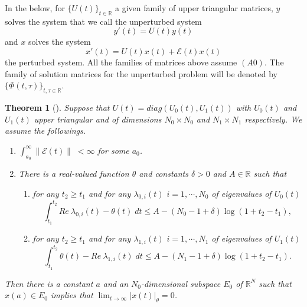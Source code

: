 \documentclass[a4paper,11pt]{article}
\newcommand{\upl}{\overline{\lambda}}
\newcommand{\udl}{\underline{\lambda}}
\newcommand{\E}{\mathcal{E}}
\newcounter{Theorem}
\newtheorem{theorem}[Theorem]{Theorem}
\theoremstyle{remark}
\begin{document}
In the below, for $\{U(t)\}_{t \in \mathbb{R}}$ a given family of upper triangular matrices, $y$ solves the system that we call the unperturbed system
\begin{equation}\label{eq:1}
 y'(t)=U(t)y(t)
\end{equation}
and $x$ solves the system
\begin{equation}\label{eq:2}
 x'(t) = U(t)x(t) + \E(t)x(t)
\end{equation}
the perturbed system. All the families of matrices above assume $(A0)$. The family of solution matrices for the unperturbed problem will be denoted by $\{\Phi(t,\tau)\}_{t,\tau \in \mathbb{R}}$.

% 
% 
% 
% 
% 
% 


\begin{theorem}[\cite{L19}] Suppose that $U(t)=diag(U_0(t),U_1(t))$ with $U_0(t)$ and $U_1(t)$ upper triangular and of dimensions $N_0\times N_0$ and $N_1 \times N_1$ respectively. We assume the followings.%
\begin{enumerate}
 \item $\int_{a_0}^\infty \|\E(t)\| \; < \infty$ for some $a_0$.
 \item There is a real-valued function $\theta$ and constants $\delta >0$ and $A\in \mathbb{R}$ such that
 \begin{enumerate}
  \item for any $t_2\ge t_1$ and for any $\lambda_{0,i}(t)$ $i=1,\cdots,N_0$ of eigenvalues of $U_0(t)$ 
  $$ \int_{t_1}^{t_2} Re\: \lambda_{0,i}(t) - \theta(t) \; dt \le A -(N_0 -1 +\delta)\log(1+t_2-t_1),$$
 \item for any $t_2\ge t_1$ and for any $\lambda_{1,i}(t)$ $i=1,\cdots,N_1$ of eigenvalues of $U_1(t)$
  $$ \int_{t_1}^{t_2} \theta(t)- Re\: \lambda_{1,i}(t) \; dt \le A -(N_1 -1 +\delta)\log(1+t_2-t_1).$$
 \end{enumerate}
\end{enumerate}
Then there is a constant $a$ and an $N_0$-dimensional subspace $E_0$ of  $ \mathbb{R}^N$  such that $x(a)\in E_0$ implies that $\displaystyle \lim_{t \rightarrow \infty}|x(t)|_\theta =0$. %
\end{theorem}
\end{document}
